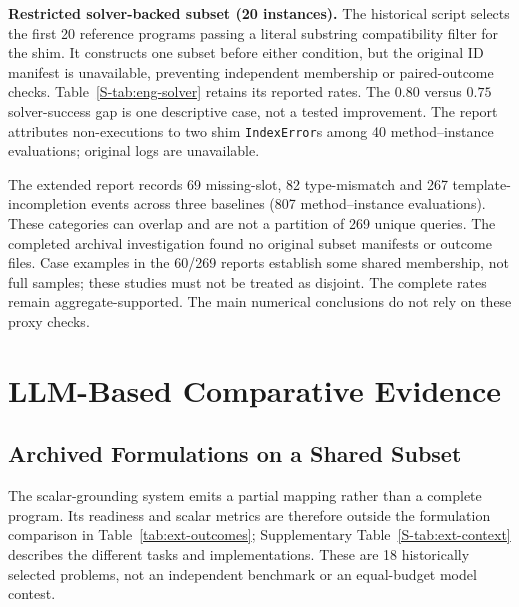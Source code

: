\documentclass[pdflatex,sn-basic,Numbered]{sn-jnl}
\begin{document}
\medskip\noindent\textbf{Restricted solver-backed subset (20 instances).}
The historical script selects the first 20 reference programs passing a literal substring compatibility filter for the shim. It constructs one subset before either condition, but the original ID manifest is unavailable, preventing independent membership or paired-outcome checks. Table~\ref{S-tab:eng-solver} retains its reported rates. The $0.80$ versus $0.75$ solver-success gap is one descriptive case, not a tested improvement. The report attributes non-executions to two shim \texttt{IndexError}s among 40 method--instance evaluations; original logs are unavailable.



The extended report records 69 missing-slot, 82 type-mismatch and 267 template-incompletion events across three baselines (807 method--instance evaluations). These categories can overlap and are not a partition of 269 unique queries. The completed archival investigation found no original subset manifests or outcome files. Case examples in the 60/269 reports establish some shared membership, not full samples; these studies must not be treated as disjoint. The complete rates remain aggregate-supported. The main numerical conclusions do not rely on these proxy checks.

\section{LLM-Based Comparative Evidence}
\label{sec:llm}
\subsection{Archived Formulations on a Shared Subset}
\label{subsec:exp_external}
The scalar-grounding system emits a partial mapping rather than a complete program. Its readiness and scalar metrics are therefore outside the formulation comparison in Table~\ref{tab:ext-outcomes}; Supplementary Table~\ref{S-tab:ext-context} describes the different tasks and implementations. These are 18 historically selected problems, not an independent benchmark or an equal-budget model contest.
\end{document}
